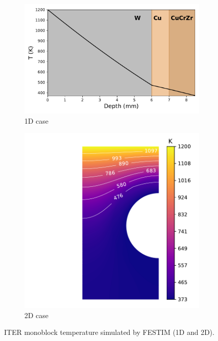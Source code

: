 \begin{figure}
    \centering
    \begin{subfigure}{0.5\linewidth}                              
        \includegraphics[width=\linewidth]{Figures/Chapter3/monoblocks/interface_condition/iter case/temperature_1D.pdf}
        \caption{1D case}
        \label{fig: 1D temperature}
    \end{subfigure}%
    \begin{subfigure}{0.5\linewidth}                          
        \includegraphics[width=\linewidth]{Figures/Chapter3/monoblocks/interface_condition/iter case/temperature_field_2d.pdf}
        \caption{2D case}
        \label{fig: 2D temperature}
    \end{subfigure}%
    \caption{ITER monoblock temperature simulated by FESTIM (1D and 2D).}
    \label{fig: temperature}
\end{figure}

